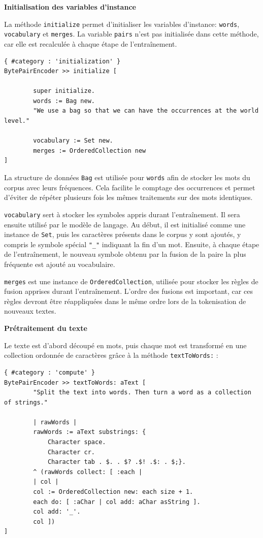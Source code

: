 \documentclass[12pt,a4paper]{report}
\begin{document}
\textbf{Initialisation des variables d’instance}

La méthode \texttt{initialize} permet d’initialiser les variables d’instance: \texttt{words}, \texttt{vocabulary} et \texttt{merges}. La variable \texttt{pairs} n’est pas initialisée dans cette méthode, car elle est recalculée à chaque étape de l’entraînement.

\begin{verbatim}
{ #category : 'initialization' }
BytePairEncoder >> initialize [

		super initialize.
		words := Bag new. 
		"We use a bag so that we can have the occurrences at the world level."

		vocabulary := Set new.
		merges := OrderedCollection new
]
\end{verbatim}

La structure de données \texttt{Bag} est utilisée pour \texttt{words} afin de stocker les mots du corpus avec leurs fréquences. Cela facilite le comptage des occurrences et permet d’éviter de répéter plusieurs fois les mêmes traitements sur des mots identiques.

\texttt{vocabulary} sert à stocker les symboles appris durant l’entraînement. Il sera ensuite utilisé par le modèle de langage. Au début, il est initialisé comme une instance de \texttt{Set}, puis les caractères présents dans le corpus y sont ajoutés, y compris le symbole spécial \texttt{"\_"} indiquant la fin d’un mot. Ensuite, à chaque étape de l’entraînement, le nouveau symbole obtenu par la fusion de la paire la plus fréquente est ajouté au vocabulaire.

\texttt{merges} est une instance de \texttt{OrderedCollection}, utilisée pour stocker les règles de fusion apprises durant l’entraînement. L’ordre des fusions est important, car ces règles devront être réappliquées dans le même ordre lors de la tokenisation de nouveaux textes.

\textbf{Prétraitement du texte}

Le texte est d'abord découpé en mots, puis chaque mot est transformé en une collection ordonnée de caractères grâce à la méthode \texttt{textToWords:} :

\begin{verbatim}
{ #category : 'compute' }
BytePairEncoder >> textToWords: aText [
		"Split the text into words. Then turn a word as a collection of strings."

		| rawWords |
		rawWords := aText substrings: {
			Character space.
			Character cr.
			Character tab . $. . $? .$! .$: . $;}.
		^ (rawWords collect: [ :each |
		| col |
		col := OrderedCollection new: each size + 1.
		each do: [ :aChar | col add: aChar asString ].
		col add: '_'.
		col ])
]
\end{verbatim}
\end{document}
